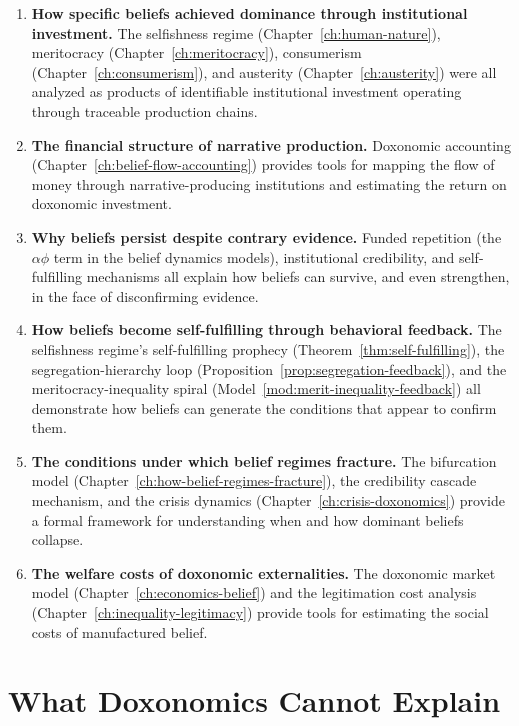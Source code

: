 \begin{enumerate}
  \item \textbf{How specific beliefs achieved dominance through institutional investment.}
  The selfishness regime (Chapter~\ref{ch:human-nature}), meritocracy (Chapter~\ref{ch:meritocracy}), consumerism (Chapter~\ref{ch:consumerism}), and austerity (Chapter~\ref{ch:austerity}) were all analyzed as products of identifiable institutional investment operating through traceable production chains.

  \item \textbf{The financial structure of narrative production.}
  Doxonomic accounting (Chapter~\ref{ch:belief-flow-accounting}) provides tools for mapping the flow of money through narrative-producing institutions and estimating the return on doxonomic investment.

  \item \textbf{Why beliefs persist despite contrary evidence.}
  Funded repetition (the $\alpha\phi$ term in the belief dynamics models), institutional credibility, and self-fulfilling mechanisms all explain how beliefs can survive, and even strengthen, in the face of disconfirming evidence.

  \item \textbf{How beliefs become self-fulfilling through behavioral feedback.}
  The selfishness regime's self-fulfilling prophecy (Theorem~\ref{thm:self-fulfilling}), the segregation-hierarchy loop (Proposition~\ref{prop:segregation-feedback}), and the meritocracy-inequality spiral (Model~\ref{mod:merit-inequality-feedback}) all demonstrate how beliefs can generate the conditions that appear to confirm them.

  \item \textbf{The conditions under which belief regimes fracture.}
  The bifurcation model (Chapter~\ref{ch:how-belief-regimes-fracture}), the credibility cascade mechanism, and the crisis dynamics (Chapter~\ref{ch:crisis-doxonomics}) provide a formal framework for understanding when and how dominant beliefs collapse.

  \item \textbf{The welfare costs of doxonomic externalities.}
  The doxonomic market model (Chapter~\ref{ch:economics-belief}) and the legitimation cost analysis (Chapter~\ref{ch:inequality-legitimacy}) provide tools for estimating the social costs of manufactured belief.
\end{enumerate}

\section{What Doxonomics Cannot Explain}
\label{sec:ch35-cannot}

